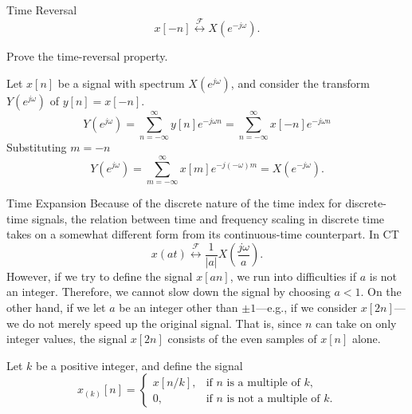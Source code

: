 \begin{frame}{Time Reversal}
    \begin{equation*}
        x[-n] \overset{\mathcal{F}}{\leftrightarrow} X(e^{-j\omega}).
    \end{equation*}
    \begin{example}
        Prove the time-reversal property.
    \end{example}
    \pause
    {
        Let $x[n]$ be a signal with spectrum $X(e^{j\omega})$, and consider the transform $Y(e^{j\omega})$ of $y[n] = x[-n]$.
        \begin{equation*}
            Y(e^{j\omega}) = \sum_{n=-\infty}^{\infty}y[n] e^{-j\omega n} = \sum_{n=-\infty}^{\infty}x[-n] e^{-j\omega n}
        \end{equation*}
        Substituting $m=-n$
        \begin{equation*}
            Y(e^{j\omega}) = \sum_{m=-\infty}^{\infty}x[m] e^{-j(-\omega)m} = X(e^{-j\omega}).
        \end{equation*}
    }
\end{frame}

\begin{frame}{Time Expansion}
    Because of the discrete nature of the time index for discrete-time signals, the relation between time and frequency scaling in discrete time takes on a somewhat different form from its continuous-time counterpart. In CT
    \begin{equation*}
        x(at)  \overset{\mathcal{F}}{\leftrightarrow}  \frac{1}{|a|} X\left(\frac{j\omega}{a}\right).
    \end{equation*}
    However, if we try to define the signal $x[an]$, we run into difficulties if $a$ is not an integer. Therefore, we cannot slow down the signal by choosing $a < 1$. On the other hand, if we let $a$ be an integer other than $\pm1$---e.g., if we consider $x[2n]$---we do not merely
    speed up the original signal. That is, since $n$ can take on only integer values, the signal $x[2n]$ consists of the even samples of $x[n]$ alone.

    Let $k$ be a positive integer, and define the signal
    \begin{equation*}
        x_{(k)}[n] = \begin{cases}x[n/k], & \text{if $n$ is a multiple of $k$},\\0, & \text{if $n$ is not a multiple of $k$}. \end{cases}
    \end{equation*}
\end{frame}

